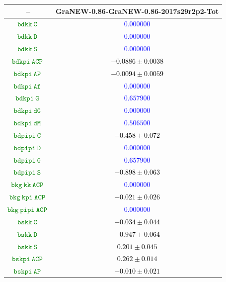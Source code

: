 \documentclass[10pt,a4paper]{article}
\begin{document}
\begin{table}[h!]
\centering
\begin{tabular}{cc}
\hline
 \textbf{--} & \textbf{GraNEW-0.86-GraNEW-0.86-2017s29r2p2-Tot}\\
\hline
\textcolor{Green}{$\mathtt{bdkk~C~}$} & \textcolor{blue}{$0.000000$}\\
\textcolor{Green}{$\mathtt{bdkk~D~}$} & \textcolor{blue}{$0.000000$}\\
\textcolor{Green}{$\mathtt{bdkk~S~}$} & \textcolor{blue}{$0.000000$}\\
\textcolor{Green}{$\mathtt{bdkpi~ACP~}$} & \textcolor{black}{$-0.0886 \pm 0.0038$}\\
\textcolor{Green}{$\mathtt{bdkpi~AP~}$} & \textcolor{black}{$-0.0094 \pm 0.0059$}\\
\textcolor{Green}{$\mathtt{bdkpi~Af~}$} & \textcolor{blue}{$0.000000$}\\
\textcolor{Green}{$\mathtt{bdkpi~G~}$} & \textcolor{blue}{$0.657900$}\\
\textcolor{Green}{$\mathtt{bdkpi~dG~}$} & \textcolor{blue}{$0.000000$}\\
\textcolor{Green}{$\mathtt{bdkpi~dM~}$} & \textcolor{blue}{$0.506500$}\\
\textcolor{Green}{$\mathtt{bdpipi~C~}$} & \textcolor{black}{$-0.458 \pm 0.072$}\\
\textcolor{Green}{$\mathtt{bdpipi~D~}$} & \textcolor{blue}{$0.000000$}\\
\textcolor{Green}{$\mathtt{bdpipi~G~}$} & \textcolor{blue}{$0.657900$}\\
\textcolor{Green}{$\mathtt{bdpipi~S~}$} & \textcolor{black}{$-0.898 \pm 0.063$}\\
\textcolor{Green}{$\mathtt{bkg~kk~ACP~}$} & \textcolor{blue}{$0.000000$}\\
\textcolor{Green}{$\mathtt{bkg~kpi~ACP~}$} & \textcolor{black}{$-0.021 \pm 0.026$}\\
\textcolor{Green}{$\mathtt{bkg~pipi~ACP~}$} & \textcolor{blue}{$0.000000$}\\
\textcolor{Green}{$\mathtt{bskk~C~}$} & \textcolor{black}{$-0.034 \pm 0.044$}\\
\textcolor{Green}{$\mathtt{bskk~D~}$} & \textcolor{black}{$-0.947 \pm 0.064$}\\
\textcolor{Green}{$\mathtt{bskk~S~}$} & \textcolor{black}{$0.201 \pm 0.045$}\\
\textcolor{Green}{$\mathtt{bskpi~ACP~}$} & \textcolor{black}{$0.262 \pm 0.014$}\\
\textcolor{Green}{$\mathtt{bskpi~AP~}$} & \textcolor{black}{$-0.010 \pm 0.021$}\\

\end{tabular}
\end{table}
\end{document}
